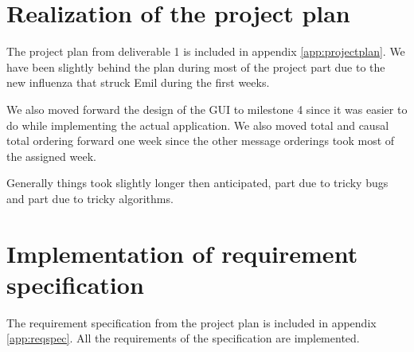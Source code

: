 \documentclass[a4paper,english]{article}
\begin{document}
\section{Realization of the project plan}
The project plan from deliverable 1 is included in appendix \vref{app:projectplan}. We have been slightly behind the plan during most of the project part due to the new influenza that struck Emil during the first weeks.

We also moved forward the design of the GUI to milestone 4 since it was easier to do while implementing the actual application. We also moved total and causal total ordering forward one week since the other message orderings took most of the assigned week. 

Generally things took slightly longer then anticipated, part due to tricky bugs and part due to tricky algorithms. 

\section{Implementation of requirement specification}
The requirement specification from the project plan is included in appendix \vref{app:reqspec}. All the requirements of the specification are implemented. 

\end{document}
